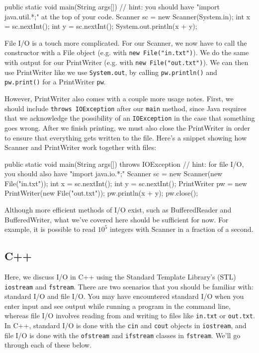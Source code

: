 \begin{mylstlisting}
public static void main(String args[]) {
  // hint: you should have "import java.util.*;" at the top of your code.
  Scanner sc = new Scanner(System.in);
  int x = sc.nextInt();
  int y = sc.nextInt();
  System.out.println(x + y);
}
\end{mylstlisting}

File I/O is a touch more complicated. For our Scanner, we now have to call the constructor with a File object (e.g. with \texttt{new File("in.txt")}). We do the same with output for our PrintWriter (e.g. with \texttt{new File("out.txt")}). We can then use PrintWriter like we use \texttt{System.out}, by calling \texttt{pw.println()} and \texttt{pw.print()} for a PrintWriter \texttt{pw}.

However, PrintWriter also comes with a couple more usage notes. First, we should include \texttt{throws IOException} after our \texttt{main} method, since Java requires that we acknowledge the possibility of an \texttt{IOException} in the case that something goes wrong. After we finish printing, we must also close the PrintWriter in order to ensure that everything gets written to the file. Here's a snippet showing how Scanner and PrintWriter work together with files: 

\begin{mylstlisting}
public static void main(String args[]) throws IOException {
  // hint: for file I/O, you should also have "import java.io.*;"
  Scanner sc = new Scanner(new File("in.txt"));
  int x = sc.nextInt();
  int y = sc.nextInt();
  PrintWriter pw = new PrintWriter(new File("out.txt"));
  pw.println(x + y);
  pw.close();
}
\end{mylstlisting}

Although more efficient methods of I/O exist, such as BufferedReader and BufferedWriter, what we've covered here should be sufficient for now. For example, it is possible to read $10^5$ integers with Scanner in a fraction of a second.

\subsection{C++}

Here, we discuss I/O in C++ using the Standard Template Library's (STL) \texttt{iostream} and \texttt{fstream}. There are two scenarios that you should be familiar with: standard I/O and file I/O. You may have encountered standard I/O when you enter input and see output while running a program in the command line, whereas file I/O involves reading from and writing to files like \texttt{in.txt} or \texttt{out.txt}. In C++, standard I/O is done with the \texttt{cin} and \texttt{cout} objects in \texttt{iostream}, and file I/O is done with the \texttt{ofstream} and \texttt{ifstream} classes in \texttt{fstream}. We'll go through each of these below.

